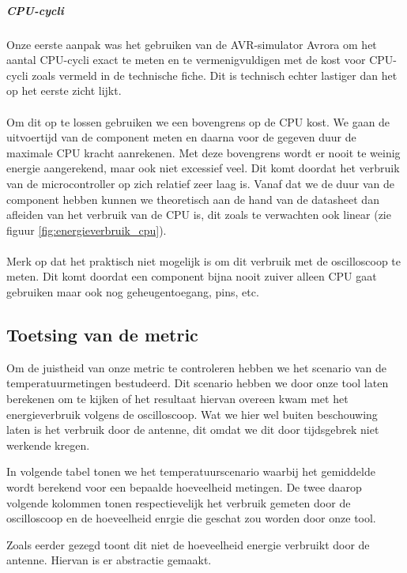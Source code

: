 \documentclass[11pt]{article}
\begin{document}
\subparagraph{CPU-cycli}

Onze eerste aanpak was het gebruiken van de AVR-simulator Avrora
\cite{titzer2005avrora} om het aantal CPU-cycli exact te meten en te
vermenigvuldigen met de kost voor CPU-cycli zoals vermeld in de technische
fiche. Dit is technisch echter lastiger dan het op het eerste zicht lijkt.
\\
\\
Om dit op te lossen gebruiken we een bovengrens op de CPU kost. We gaan de
uitvoertijd van de component meten en daarna voor de gegeven duur de maximale
CPU kracht aanrekenen. Met deze bovengrens wordt er nooit te weinig energie
aangerekend, maar ook niet excessief veel. Dit komt doordat het verbruik van de
microcontroller op zich relatief zeer laag is. Vanaf dat we de duur van de
component hebben kunnen we theoretisch aan de hand van de datasheet dan afleiden
van het verbruik van de CPU is, dit zoals te verwachten ook linear (zie figuur
\ref{fig:energieverbruik_cpu}).\\
\\
Merk op dat het praktisch niet mogelijk is om dit verbruik met de oscilloscoop te meten.
Dit komt doordat een component bijna nooit zuiver alleen CPU gaat gebruiken maar ook nog geheugentoegang, pins, etc. 

\subsection{Toetsing van de metric}

Om de juistheid van onze metric te controleren hebben we het scenario van de
temperatuurmetingen bestudeerd. Dit scenario hebben we door onze tool laten
berekenen om te kijken of het resultaat hiervan overeen kwam met het
energieverbruik volgens de oscilloscoop. Wat we hier wel buiten beschouwing
laten is het verbruik door de antenne, dit omdat we dit door tijdsgebrek niet werkende kregen.

In volgende tabel tonen we het temperatuurscenario waarbij het gemiddelde wordt
berekend voor een bepaalde hoeveelheid metingen. De twee daarop volgende
kolommen tonen respectievelijk het verbruik gemeten door de oscilloscoop en de
hoeveelheid enrgie die geschat zou worden door onze tool.

Zoals eerder gezegd toont dit niet de hoeveelheid energie verbruikt door de antenne. Hiervan is er abstractie gemaakt. 
\end{document}

